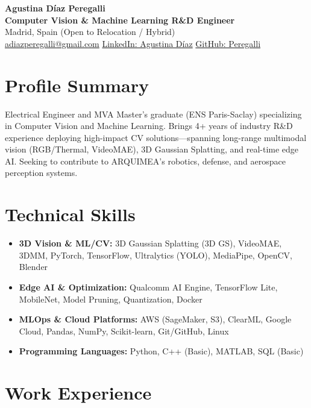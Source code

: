 \documentclass[10pt, a4paper]{article}
\begin{document}
\begin{center}
    {\LARGE \textbf{Agustina Díaz Peregalli}} \\ \vspace{2pt}
    {\large \textbf{Computer Vision \& Machine Learning R\&D Engineer}} \\ \vspace{2pt}
    Madrid, Spain \textbar{} (Open to Relocation / Hybrid) \\ \vspace{2pt}
    \href{mailto:adiazperegalli@gmail.com}{adiazperegalli@gmail.com} \textbar{} 
    \href{https://www.linkedin.com/in/agustina-diaz-peregalli/}{LinkedIn: Agustina Díaz} \textbar{} 
    \href{https://github.com/Peregalli}{GitHub: Peregalli}
\end{center}

\section{Profile Summary}
Electrical Engineer and MVA Master's graduate (ENS Paris-Saclay) specializing in Computer Vision and Machine Learning. Brings 4+ years of industry R\&D experience deploying high-impact CV solutions—spanning long-range multimodal vision (RGB/Thermal, VideoMAE), 3D Gaussian Splatting, and real-time edge AI. Seeking to contribute to ARQUIMEA's robotics, defense, and aerospace perception systems.

\section{Technical Skills}
\begin{itemize}
    \item \textbf{3D Vision \& ML/CV:} 3D Gaussian Splatting (3D GS), VideoMAE, 3DMM, PyTorch, TensorFlow, Ultralytics (YOLO), MediaPipe, OpenCV, Blender
    \item \textbf{Edge AI \& Optimization:} Qualcomm AI Engine, TensorFlow Lite, MobileNet, Model Pruning, Quantization, Docker
    \item \textbf{MLOps \& Cloud Platforms:} AWS (SageMaker, S3), ClearML, Google Cloud, Pandas, NumPy, Scikit-learn, Git/GitHub, Linux
    \item \textbf{Programming Languages:} Python, C++ (Basic), MATLAB, SQL (Basic)
\end{itemize}

\section{Work Experience}
\end{document}
